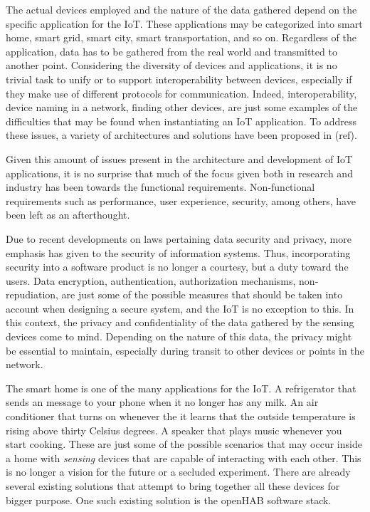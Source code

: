 \documentclass[12pt]{article}
\newcommand{\TODO}{\todo[inline]}
\begin{document}
The actual devices employed and the nature of the data gathered depend on the specific application for the IoT. These applications may be categorized into smart home, smart grid, smart city, smart transportation, and so on. Regardless of the application, data has to be gathered from the real world and transmitted to another point. Considering the diversity of devices and applications, it is no trivial task to unify or to support interoperability between devices, especially if they make use of different protocols for communication. Indeed, interoperability, device naming in a network, finding other devices, are just some examples of the difficulties that may be found when instantiating an IoT application. To address these issues, a variety of architectures and solutions have been proposed in (ref). 

Given this amount of issues present in the architecture and development of IoT applications, it is no surprise that much of the focus given both in research and industry has been towards the functional requirements. Non-functional requirements such as performance, user experience, security, among others, have been left as an afterthought.



\TODO{look for reference on law about privacy}
Due to recent developments on laws pertaining data security and privacy, more emphasis has given to the security of information systems. Thus, incorporating security into a software product is no longer a courtesy, but a duty toward the users. Data encryption, authentication, authorization mechanisms, non-repudiation, are just some of the possible measures that should be taken into account when designing a secure system, and the IoT is no exception to this. In this context, the privacy and confidentiality of the data gathered by the sensing devices come to mind. Depending on the nature of this data, the privacy might be essential to maintain, especially during transit to other devices or points in the network.

The smart home is one of the many applications for the IoT. A refrigerator that sends an message to your phone when it no longer has any milk. An air conditioner that turns on whenever the it learns that the outside temperature is rising above thirty Celsius degrees. A speaker that plays music whenever you start cooking. These are just some of the possible scenarios that may occur inside a home with \emph{sensing} devices that are capable of interacting with each other. This is no longer a vision for the future or a secluded experiment. There are already several existing solutions that attempt to bring together all these devices for bigger purpose. One such existing solution is the openHAB software stack.
\end{document}
